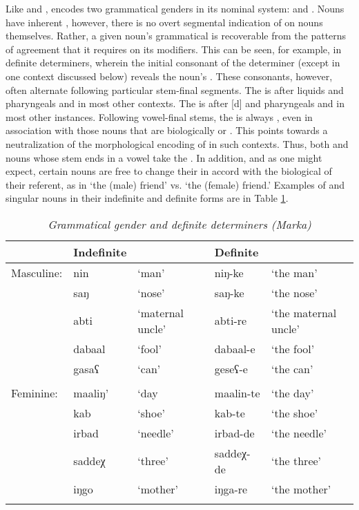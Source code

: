 \documentclass[output=paper]{LSP/langsci}
\begin{document}
 Like  and ,  encodes two grammatical genders in its nominal system:  and . Nouns have inherent , however, there is no overt segmental indication of  on nouns themselves. Rather, a given noun's grammatical  is recoverable from the patterns of agreement that it requires on its modifiers. This can be seen, for example, in definite determiners, wherein the initial consonant of the determiner (except in one context discussed below) reveals the noun's . These consonants, however, often alternate following particular stem-final segments. The   is  after liquids and pharyngeals and  in most other contexts. The   is  after [d] and pharyngeals and  in most other instances. Following vowel-final stems, the  is always , even in association with those nouns that are biologically  or . This points towards a neutralization of the morphological encoding of  in such contexts. Thus, both  and  nouns whose stem ends in a vowel take the  . In addition, and as one might expect, certain nouns are free to change their  in accord with the biological  of their referent, as in  `the (male) friend' vs.  `the (female) friend.' Examples of   and  singular nouns in their indefinite and definite forms are in Table \ref{tab:1:Grammatical Gender}.
 
\vspace{6pt}

\begin{table}
 	\caption{\textit{Grammatical gender and definite determiners (Marka)}}
 	\label{tab:1:Grammatical Gender}
 	\begin{tabular}{lllll} 
 		\lsptoprule
 		 & Indefinite  &  & Definite &  \\ 
 		\midrule
 		Masculine: & nin & `man' & niŋ-ke & `the man' \\
 		 & saŋ  &   `nose' & saŋ-ke & `the nose' \\
 		 & abti & `maternal uncle' & abti-re & `the maternal uncle'  \\
 		 & dabaal & `fool' & dabaal-e & `the fool' \\
 		  & gasaʕ & `can' & geseʕ-e & `the can'\\
 		&&&&\\
 		Feminine: & maaliŋ' & `day & maalin-te & `the day' \\
 		 & kab & `shoe' & kab-te & `the shoe' \\
 		 & irbad & `needle' & irbad-de & `the needle' \\
 		  & saddeχ & `three' & saddeχ-de & `the three' \\
	 	& iŋgo & `mother' & iŋga-re & `the mother' \\
 		\lspbottomrule
 	\end{tabular}
 \end{table}
 
\end{document}
